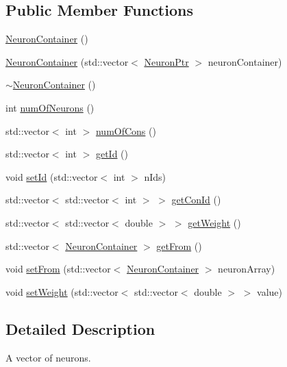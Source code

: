 \subsection*{Public Member Functions}
\begin{DoxyCompactItemize}
\item 
\hyperlink{class_neuron_container_a9b22029b084f7446d2dfafc2e8f89700}{NeuronContainer} ()
\item 
\hyperlink{class_neuron_container_a85e1e7946db7317179adbe359dc4ac39}{NeuronContainer} (std::vector$<$ \hyperlink{_a_m_o_r_e_8h_a1948728c64a74ecbdc50c0f0e43ecfd1}{NeuronPtr} $>$ neuronContainer)
\item 
\hyperlink{class_neuron_container_a908e984efdd9dc08b507c95b23b295dd}{$\sim$NeuronContainer} ()
\item 
int \hyperlink{class_neuron_container_a37132392f025c0358d2f47a03bb4854f}{numOfNeurons} ()
\item 
std::vector$<$ int $>$ \hyperlink{class_neuron_container_a70c5fd8e735b04c48b29cc17b77ff301}{numOfCons} ()
\item 
std::vector$<$ int $>$ \hyperlink{class_neuron_container_a2ca2c86b3a0517636b1a0b3debfd158d}{getId} ()
\item 
void \hyperlink{class_neuron_container_a17c57249055e5de605e9663384ca48ce}{setId} (std::vector$<$ int $>$ nIds)
\item 
std::vector$<$ std::vector$<$ int $>$ $>$ \hyperlink{class_neuron_container_ad3ce88ba0e1beba4b60bac38c1cd2ccd}{getConId} ()
\item 
std::vector$<$ std::vector$<$ double $>$ $>$ \hyperlink{class_neuron_container_ad11f5391b58f32b6db45f31fdc4927e7}{getWeight} ()
\item 
std::vector$<$ \hyperlink{class_neuron_container}{NeuronContainer} $>$ \hyperlink{class_neuron_container_a3a0ea5632f0dfbf3159db657d6de84db}{getFrom} ()
\item 
void \hyperlink{class_neuron_container_a058524958a0fe0dfd946d9e7f4003310}{setFrom} (std::vector$<$ \hyperlink{class_neuron_container}{NeuronContainer} $>$ neuronArray)
\item 
void \hyperlink{class_neuron_container_a54d5bfaf428ab9bc66aac79c312ab997}{setWeight} (std::vector$<$ std::vector$<$ double $>$ $>$ value)
\end{DoxyCompactItemize}


\subsection{Detailed Description}
A vector of neurons. 

